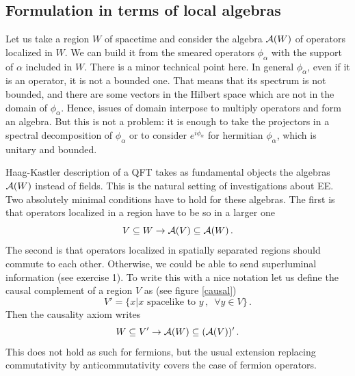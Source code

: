 \documentclass[11pt]{article}
\numberwithin{equation}{section}
\newcommand{\be}{\begin{equation}}
\newcommand{\ee}{\end{equation}}
\begin{document}
\subsection{Formulation in terms of local algebras}
Let us take a region $W$ of spacetime and consider the algebra ${\cal A}(W)$ of operators localized in $W$. We can build it from the smeared operators $\phi_\alpha$ with the support of $\alpha$ included in $W$. There is a minor technical point here. In general $\phi_\alpha$, even if it is an operator, it is not a bounded one. That means that its spectrum is not bounded, and there are some vectors in the Hilbert space which are not in the domain of $\phi_\alpha$. Hence, issues of domain interpose to multiply operators and form an algebra. But this is not a problem: it is enough to take the projectors in a spectral decomposition of $\phi_\alpha$ or to consider $e^{i \phi_\alpha}$ for hermitian $\phi_\alpha$, which is unitary and bounded. 

 

Haag-Kastler description of a QFT takes as fundamental objects the algebras ${\cal A}(W)$ instead of fields. This is the natural setting of investigations about EE. Two absolutely minimal conditions have to hold for these algebras. The first is that operators localized in a region have to be so in a larger one   
\be
V\subseteq W\rightarrow  {\cal A}(V) \subseteq {\cal A}(W)\,.
\ee
The second is that operators localized in spatially separated regions should commute to each other. Otherwise, we could be able to send superluminal information (see exercise 1). To write this with a nice notation let us define the causal complement of a region $V$ as (see figure \ref{causal})
\be
V'=\{x | x \,\,\textrm{spacelike to }y\,, \,\,\, \forall y \in V\}\,.  
\ee
Then the causality axiom writes 
\be
W\subseteq V'\rightarrow {\cal A}(W)\subseteq ({\cal A}(V))'\,.
\ee
This does not hold as such for fermions, but the usual extension replacing commutativity by anticommutativity covers the case of fermion operators.  
\end{document}
